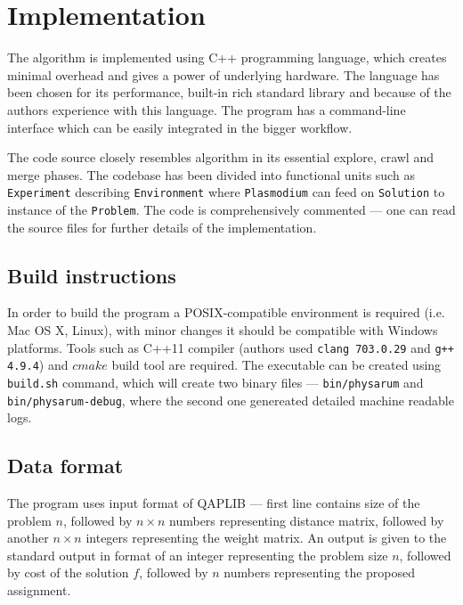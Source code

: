 \section{Implementation}
\label{section:project_implementation}

The algorithm is implemented using C++ programming language, which creates minimal overhead and gives a power of underlying hardware. The language has been chosen for its performance, built-in rich standard library and because of the authors experience with this language. The program has a command-line interface which can be easily integrated in the bigger workflow.

The code source closely resembles algorithm in its essential explore, crawl and merge phases. The codebase has been divided into functional units such as \texttt{Experiment} describing \texttt{Environment} where \texttt{Plasmodium} can feed on \texttt{Solution} to instance of the \texttt{Problem}. The code is comprehensively commented --- one can read the source files for further details of the implementation.

\subsection{Build instructions}

In order to build the program a POSIX-compatible environment is required (i.e. Mac OS X, Linux), with minor changes it should be compatible with Windows platforms. Tools such as C++11 compiler (authors used \texttt{clang 703.0.29} and \texttt{g++ 4.9.4}) and $cmake$ build tool are required. The executable can be created using \texttt{build.sh} command, which will create two binary files --- \texttt{bin/physarum} and \texttt{bin/physarum-debug}, where the second one genereated detailed machine readable logs.

\subsection{Data format}

The program uses input format of QAPLIB \cite{burkard1997qaplib} --- first line contains size of the problem $n$, followed by $n{\times}n$ numbers representing distance matrix, followed by another $n{\times}n$ integers representing the weight matrix. An output is given to the standard output in format of an integer representing the problem size $n$, followed by cost of the solution $f$, followed by $n$ numbers representing the proposed assignment.

